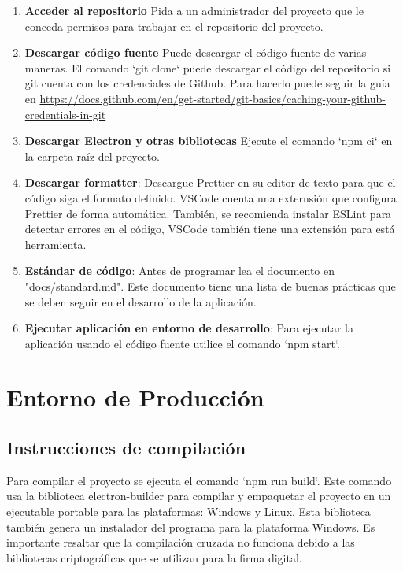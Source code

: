 \begin{enumerate}
	\item \textbf{Acceder al repositorio} Pida a un administrador del proyecto que le conceda permisos para trabajar en el repositorio del proyecto.

	\item \textbf{Descargar código fuente} Puede descargar el código fuente de varias maneras. El comando `git clone` puede descargar el código del repositorio si git cuenta con los credenciales de Github. Para hacerlo puede seguir la guía en \url{https://docs.github.com/en/get-started/git-basics/caching-your-github-credentials-in-git}

	\item \textbf{Descargar Electron y otras bibliotecas} Ejecute el comando `npm ci` en la carpeta raíz del proyecto.

	\item \textbf{Descargar formatter}: Descargue Prettier en su editor de texto para que el código siga el formato definido. VSCode cuenta una externsión que configura Prettier de forma automática. También, se recomienda instalar ESLint para detectar errores en el código, VSCode también tiene una extensión para está herramienta.

	\item \textbf{Estándar de código}: Antes de programar lea el documento en "docs/standard.md". Este documento tiene una lista de buenas prácticas que se deben seguir en el desarrollo de la aplicación.

	\item \textbf{Ejecutar aplicación en entorno de desarrollo}: Para ejecutar la aplicación usando el código fuente utilice el comando `npm start`.

\end{enumerate}

\section{Entorno de Producción}

\subsection{Instrucciones de compilación}
Para compilar el proyecto se ejecuta el comando `npm run build`. Este comando usa la biblioteca electron-builder para compilar y empaquetar el proyecto en un ejecutable portable para las plataformas: Windows y Linux. Esta biblioteca también genera un instalador del programa para la plataforma Windows. Es importante resaltar que la compilación cruzada no funciona debido a las bibliotecas criptográficas que se utilizan para la firma digital.

